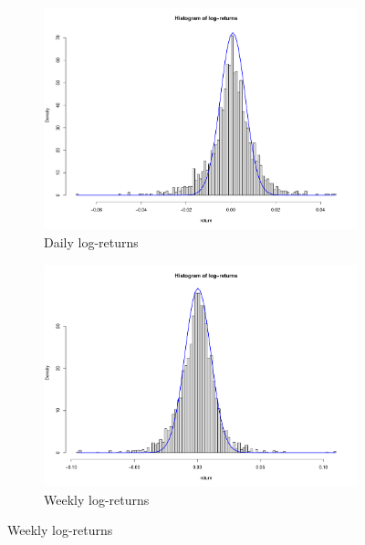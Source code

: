 \begin{figure}[hbtp]
	\centering
	\begin{subfigure}{.5\textwidth}
		\centering
		\includegraphics[scale=.2]{img/finData/histDailyLogRet}
		\caption{Daily log-returns}
	\end{subfigure}%
	\begin{subfigure}{.5\textwidth}
		\centering
		\includegraphics[scale=.2]{img/finData/histWeeklyLogRet}
		\caption{Weekly log-returns}
	\end{subfigure}
	
	\vspace{.4cm}
	

\end{figure}
